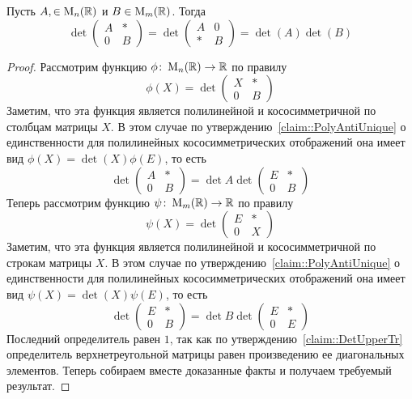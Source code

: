 \begin{claim}
Пусть $A,\in\operatorname{M}_{n}(\mathbb R)$ и $B\in\operatorname{M}_{m}(\mathbb R)$.
Тогда
\[
\det
\begin{pmatrix}
{A}&{*}\\
{0}&{B}
\end{pmatrix}
=
\det
\begin{pmatrix}
{A}&{0}\\
{*}&{B}
\end{pmatrix}
=
\det(A) \det(B)
\]
\end{claim}
\begin{proof}
Рассмотрим функцию $\phi\colon \operatorname{M}_{n}(\mathbb R)\to \mathbb R$ по правилу
\[
\phi(X) = 
\det
\begin{pmatrix}
{X}&{*}\\
{0}&{B}
\end{pmatrix}
\]
Заметим, что эта функция является полилинейной и кососимметричной по столбцам матрицы $X$.
В этом случае по утверждению~\ref{claim::PolyAntiUnique} о единственности для полилинейных кососимметрических отображений она имеет вид $\phi(X) = \det(X)\phi(E)$, то есть
\[
\det
\begin{pmatrix}
{A}&{*}\\
{0}&{B}
\end{pmatrix}
=
\det A
\det
\begin{pmatrix}
{E}&{*}\\
{0}&{B}
\end{pmatrix}
\]
Теперь рассмотрим функцию $\psi\colon \operatorname{M}_{m}(\mathbb R)\to \mathbb R$ по правилу
\[
\psi(X) =
\det
\begin{pmatrix}
{E}&{*}\\
{0}&{X}
\end{pmatrix}
\]
Заметим, что эта функция является полилинейной и кососимметричной по строкам матрицы $X$.
В этом случае по утверждению~\ref{claim::PolyAntiUnique} о единственности для полилинейных кососимметрических отображений она имеет вид $\psi(X) = \det(X)\psi(E)$, то есть
\[
\det
\begin{pmatrix}
{E}&{*}\\
{0}&{B}
\end{pmatrix}
=
\det B
\det
\begin{pmatrix}
{E}&{*}\\
{0}&{E}
\end{pmatrix}
\]
Последний определитель равен $1$, так как по утверждению~\ref{claim::DetUpperTr} определитель верхнетреугольной матрицы равен произведению ее диагональных элементов.
Теперь собираем вместе доказанные факты и получаем требуемый результат.
\end{proof}

